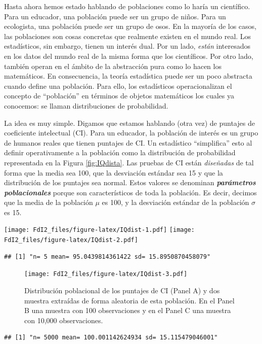 \documentclass[spanish,]{book}
\begin{document}
Hasta ahora hemos estado hablando de poblaciones como lo haría un
científico. Para un educador, una población puede ser un grupo de niños.
Para un ecologista, una población puede ser un grupo de osos. En la
mayoría de los casos, las poblaciones son cosas concretas que realmente
existen en el mundo real. Los estadísticos, sin embargo, tienen un
interés dual. Por un lado, \emph{están} interesados en los datos del
mundo real de la misma forma que los científicos. Por otro lado, también
operan en el ámbito de la abstracción pura como lo hacen los
matemáticos. En consecuencia, la teoría estadística puede ser un poco
abstracta cuando define una población. Para ello, los estadísticos
operacionalizan el concepto de ``población'' en términos de objetos
matemáticos los cuales ya conocemos: se llaman distribuciones de
probabilidad.

La idea es muy simple. Digamos que estamos hablando (otra vez) de
puntajes de coeficiente intelectual (CI). Para un educador, la población
de interés es un grupo de humanos reales que tienen puntajes de CI. Un
estadístico ``simplifica'' esto al definir operativamente a la población
como la distribución de probabilidad representada en la Figura
\ref{fig:IQdista}. Las pruebas de CI están \emph{diseñadas} de tal forma
que la media sea 100, que la desviación estándar sea 15 y que la
distribución de los puntajes sea normal. Estos valores se denominan
\textbf{\emph{parámetros poblacionales}} porque son característicos de
toda la población. Es decir, decimos que la media de la población
\(\mu\) es 100, y la desviación estándar de la población \(\sigma\) es
15.

\texttt{[image: FdI2\_files/figure-latex/IQdist-1.pdf]}
\texttt{[image: FdI2\_files/figure-latex/IQdist-2.pdf]}

\begin{verbatim}
## [1] "n= 5 mean= 95.0439814361422 sd= 15.8950870458079"
\end{verbatim}

\begin{figure}
\centering
\texttt{[image: FdI2\_files/figure-latex/IQdist-3.pdf]}
\caption{\label{fig:IQdist3}Distribución poblacional de los puntajes de CI
(Panel A) y dos muestra extraídas de forma aleatoria de esta población.
En el Panel B una muestra con 100 observaciones y en el Panel C una
muestra con 10,000 observaciones.}
\end{figure}

\begin{verbatim}
## [1] "n= 5000 mean= 100.001142624934 sd= 15.115479046001"
\end{verbatim}
\end{document}
